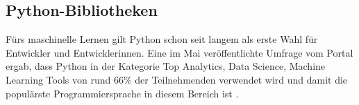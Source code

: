 \documentclass[german,bachelor]{swsLeipzig}
\begin{document}



\subsection{Python-Bibliotheken}
Fürs maschinelle Lernen gilt Python schon seit langem als erste Wahl für Entwickler und Entwicklerinnen.
Eine im Mai \citeyear{nugget} veröffentlichte Umfrage vom Portal \citeauthor{nugget} ergab, dass Python in der Kategorie
\glqq Top Analytics, Data Science, Machine Learning Tools\grqq{} von rund 66\% der Teilnehmenden verwendet wird
und damit die populärste Programmiersprache in diesem Bereich ist \cite[]{nugget}. \\
\end{document}

